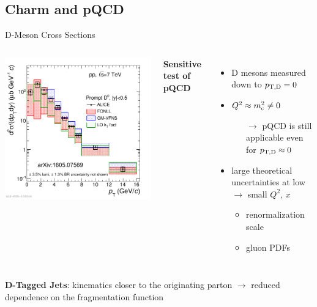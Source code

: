 \documentclass[xcolor={usenames,dvipsnames}]{beamer}
\begin{document}
\subsection{Charm and pQCD}
\begin{frame}{D-Meson Cross Sections}
\begin{columns}
\includegraphics[width=\textwidth]{img/ALICE_D0Meson}

\textbf{\alert{Sensitive test of pQCD}}
\begin{itemize}
\item D mesons measured down to \alert{$p_{\mathrm{T,D}}=0$}
\item \alert{$Q^2\approx m_{\rm c}^2 \neq 0$}
\begin{itemize}
\item[$\rightarrow$] pQCD is still applicable even for $p_{\mathrm{T,D}}\approx0$
\end{itemize}
\item large theoretical uncertainties at low \ptd $\rightarrow$ \alert{small $Q^2$, $x$}
\begin{itemize}
\item renormalization scale
\item gluon PDFs
\end{itemize}
\end{itemize}
\end{columns}
\medskip
\alert{\textbf{D-Tagged Jets}: kinematics closer to the originating parton} $\rightarrow$ reduced dependence on the fragmentation function
\end{frame}
\end{document}
